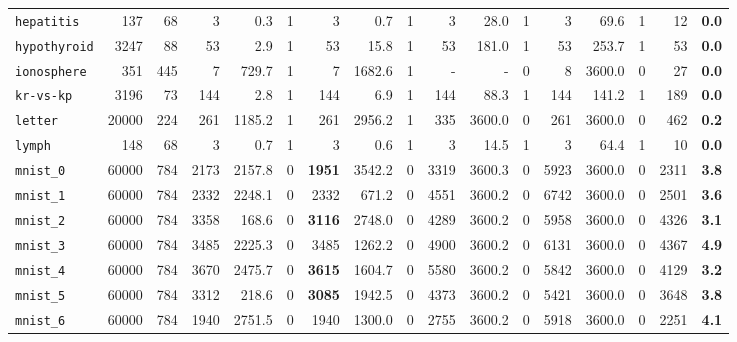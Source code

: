 \begin{tabular}{lccrrrrrrrrrrrrrr}
\texttt{hepatitis} & \multicolumn{1}{r}{137} & \multicolumn{1}{r}{68}  & 3 & 0.3 & 1 & 3 & 0.7 & 1 & 3 & 28.0 & 1 & 3 & 69.6 & 1 & 12 & \textbf{0.0}\\
\texttt{hypothyroid} & \multicolumn{1}{r}{3247} & \multicolumn{1}{r}{88}  & 53 & 2.9 & 1 & 53 & 15.8 & 1 & 53 & 181.0 & 1 & 53 & 253.7 & 1 & 53 & \textbf{0.0}\\
\texttt{ionosphere} & \multicolumn{1}{r}{351} & \multicolumn{1}{r}{445}  & 7 & 729.7 & 1 & 7 & 1682.6 & 1 & - & - & 0 & 8 & 3600.0 & 0 & 27 & \textbf{0.0}\\
\texttt{kr-vs-kp} & \multicolumn{1}{r}{3196} & \multicolumn{1}{r}{73}  & 144 & 2.8 & 1 & 144 & 6.9 & 1 & 144 & 88.3 & 1 & 144 & 141.2 & 1 & 189 & \textbf{0.0}\\
\texttt{letter} & \multicolumn{1}{r}{20000} & \multicolumn{1}{r}{224}  & 261 & 1185.2 & 1 & 261 & 2956.2 & 1 & 335 & 3600.0 & 0 & 261 & 3600.0 & 0 & 462 & \textbf{0.2}\\
\texttt{lymph} & \multicolumn{1}{r}{148} & \multicolumn{1}{r}{68}  & 3 & 0.7 & 1 & 3 & 0.6 & 1 & 3 & 14.5 & 1 & 3 & 64.4 & 1 & 10 & \textbf{0.0}\\
\texttt{mnist\_0} & \multicolumn{1}{r}{60000} & \multicolumn{1}{r}{784}  & 2173 & 2157.8 & 0 & \textbf{1951} & 3542.2 & 0 & 3319 & 3600.3 & 0 & 5923 & 3600.0 & 0 & 2311 & \textbf{3.8}\\
\texttt{mnist\_1} & \multicolumn{1}{r}{60000} & \multicolumn{1}{r}{784}  & 2332 & 2248.1 & 0 & 2332 & 671.2 & 0 & 4551 & 3600.2 & 0 & 6742 & 3600.0 & 0 & 2501 & \textbf{3.6}\\
\texttt{mnist\_2} & \multicolumn{1}{r}{60000} & \multicolumn{1}{r}{784}  & 3358 & 168.6 & 0 & \textbf{3116} & 2748.0 & 0 & 4289 & 3600.2 & 0 & 5958 & 3600.0 & 0 & 4326 & \textbf{3.1}\\
\texttt{mnist\_3} & \multicolumn{1}{r}{60000} & \multicolumn{1}{r}{784}  & 3485 & 2225.3 & 0 & 3485 & 1262.2 & 0 & 4900 & 3600.2 & 0 & 6131 & 3600.0 & 0 & 4367 & \textbf{4.9}\\
\texttt{mnist\_4} & \multicolumn{1}{r}{60000} & \multicolumn{1}{r}{784}  & 3670 & 2475.7 & 0 & \textbf{3615} & 1604.7 & 0 & 5580 & 3600.2 & 0 & 5842 & 3600.0 & 0 & 4129 & \textbf{3.2}\\
\texttt{mnist\_5} & \multicolumn{1}{r}{60000} & \multicolumn{1}{r}{784}  & 3312 & 218.6 & 0 & \textbf{3085} & 1942.5 & 0 & 4373 & 3600.2 & 0 & 5421 & 3600.0 & 0 & 3648 & \textbf{3.8}\\
\texttt{mnist\_6} & \multicolumn{1}{r}{60000} & \multicolumn{1}{r}{784}  & 1940 & 2751.5 & 0 & 1940 & 1300.0 & 0 & 2755 & 3600.2 & 0 & 5918 & 3600.0 & 0 & 2251 & \textbf{4.1}\\

\end{tabular}
